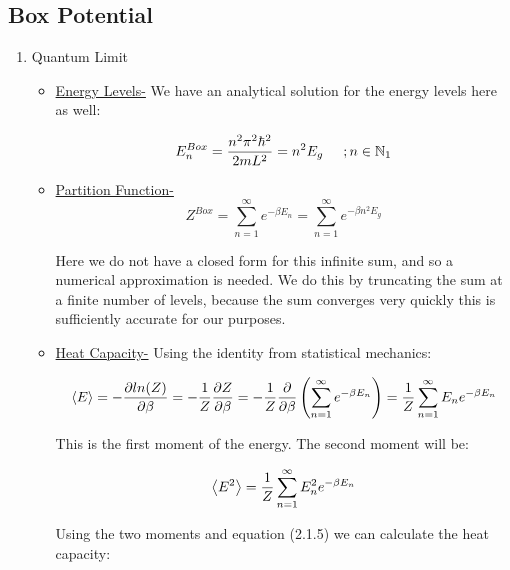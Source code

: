 \documentclass{article}
\numberwithin{equation}{subsection}
\begin{document}
\subsection{Box Potential}
\begin{enumerate}
\item{Quantum Limit}

    \begin{itemize}
        \item \underline{Energy Levels-} We have an analytical solution for the energy levels here as well:
        
        \begin{equation}
            E_n^{Box}=\frac{n^2 \pi^2 \hbar^2}{2mL^2} = n^2E_g \hspace{0.5cm} ;n \in \mathbb{N}_1
        \end{equation}
    
        \item \underline{Partition Function-} 
        \begin{equation}
            Z^{Box} = \sum_{n=1}^{\infty}e^{-\beta E_n} = \sum_{n=1}^{\infty}e^{-\beta n^2E_g}
        \end{equation}
        
        Here we do not have a closed form for this infinite sum, and so a numerical approximation is needed. We do this by truncating the sum at a finite number of levels, because the sum converges very quickly this is sufficiently accurate for our purposes.
    
        \item \underline{Heat Capacity-} Using the identity from statistical mechanics:
        
        \begin{equation}
            \expval{E}= - \frac{\partial ln(Z)}{\partial \beta} = -\frac{1}{Z}\frac{\partial Z}{\partial \beta} = -\frac{1}{Z} \frac{\partial}{\partial \beta} \left( \sum_{n=1}^{\infty}e^{-\beta E_n} \right) = \frac{1}{Z} \sum_{n=1}^\infty E_ne^{- \beta E_n}
        \end{equation}
        
        This is the first moment of the energy. The second moment will be:
        
        \begin{equation}
            \expval{E^2} = \frac{1}{Z} \sum_{n=1}^\infty E_n^2e^{- \beta E_n} 
        \end{equation}
        
        Using the two moments and equation (2.1.5) we can calculate the heat capacity:
        

\end{itemize}
\end{enumerate}
\end{document}
